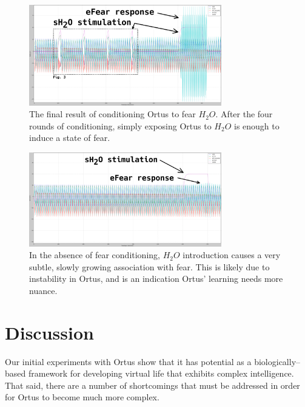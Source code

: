 \documentclass[letterpaper]{article}
\begin{document}
\begin{figure}
\begin{center}
\includegraphics[width=3.3in]{images/conditioned_small_annotated.png}
\caption{The final result of conditioning Ortus to fear $H_2O$. After the four rounds of conditioning, simply exposing Ortus to $H_2O$ is enough to induce a state of fear.}
\label{conditioned}
\end{center}
\end{figure}

\begin{figure}
\begin{center}
\includegraphics[width=3.3in]{images/no_conditioning_small_annotated.png}
\caption{In the absence of fear conditioning, $H_2O$ introduction causes a very subtle, slowly growing association with fear. This is likely due to instability in Ortus, and is an indication Ortus' learning needs more nuance.}
\label{no_conditioning}
\end{center}
\end{figure}






\section{Discussion}


Our initial experiments with Ortus show that it has potential as a biologically--based framework for developing virtual life that exhibits complex intelligence. That said, there are a number of shortcomings that must be addressed in order for Ortus to become much more complex.
\end{document}
